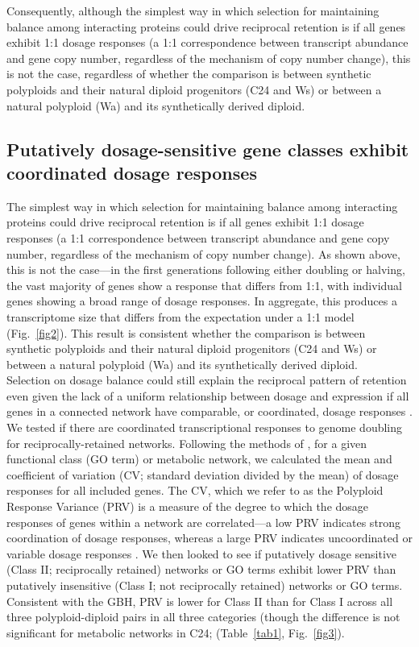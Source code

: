 \documentclass[11pt]{article}
\begin{document}
Consequently, although the simplest way in which selection for maintaining balance among interacting proteins could drive reciprocal retention is if all genes exhibit 1:1 dosage responses (a 1:1 correspondence between transcript abundance and gene copy number, regardless of the mechanism of copy number change), this is not the case, regardless of whether the comparison is between synthetic polyploids and their natural diploid progenitors (C24 and Ws) or between a natural polyploid (Wa) and its synthetically derived diploid.

\subsection*{Putatively dosage-sensitive gene classes exhibit coordinated dosage responses}
The simplest way in which selection for maintaining balance among interacting proteins could drive reciprocal retention is if all genes exhibit 1:1 dosage responses (a 1:1 correspondence between transcript abundance and gene copy number, regardless of the mechanism of copy number change).
As shown above, this is not the case---in the first generations following either doubling or halving, the vast majority of genes show a response that differs from 1:1, with individual genes showing a broad range of dosage responses.
In aggregate, this produces a transcriptome size that differs from the expectation under a 1:1 model (Fig.~\ref{fig2}).
This result is consistent whether the comparison is between synthetic polyploids and their natural diploid progenitors (C24 and Ws)  or between a natural polyploid (Wa) and its synthetically derived diploid.\\

Selection on dosage balance could still explain the reciprocal pattern of retention even given the lack of a uniform relationship between dosage and expression if all genes in a connected network have comparable, or coordinated, dosage responses \citep{coate2016}.
We tested if there are coordinated transcriptional responses to genome doubling for reciprocally-retained networks.
Following the methods of \cite{coate2016}, for a given functional class (GO term) or metabolic network, we calculated the mean and coefficient of variation (CV; standard deviation divided by the mean) of dosage responses for all included genes.
The CV, which we refer to as the Polyploid Response Variance (PRV) is a measure of the degree to which the dosage responses of genes within a network are correlated---a low PRV indicates strong coordination of dosage responses, whereas a large PRV indicates uncoordinated or variable dosage responses \citep{coate2016}.
We then looked to see if putatively dosage sensitive (Class II; reciprocally retained) networks or GO terms exhibit lower PRV than putatively insensitive (Class I; not reciprocally retained) networks or GO terms.
Consistent with the GBH, PRV is lower for Class II than for Class I across all three polyploid-diploid pairs in all three categories (though the difference is not significant for metabolic networks in C24; (Table~\ref{tab1}, Fig.~\ref{fig3}).\\
\end{document}
